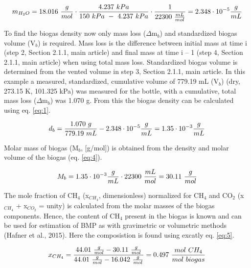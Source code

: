 \documentclass[]{article}
\begin{document}
\begin{equation*}
\centering
  m_{H_2O} = 18.016\ \frac{g}{mol} \cdot \frac{4.237\ kPa}{150\ kPa\ -\ 4.237\ kPa} \cdot \frac{1}{22300\ \frac{mL}{mol}} = 2.348 \cdot 10^{-5} \frac{g}{mL}
\end{equation*}

To find the biogas density now only mass loss ($\Delta$m$_b$) and standardized biogas volume (V$_b$) is required. Mass loss is the difference between initial mass at time i (step 2, Section 2.1.1, main article) and final mass at time i – 1 (step 4, Section 2.1.1, main article) when using total mass loss. Standardized biogas volume is determined from the vented volume in step 3, Section 2.1.1, main article.
In this example a measured, standardized, cumulative volume of 779.19 mL (V$_b$) (dry, 273.15 \degree K, 101.325 kPa) was measured for the bottle, with a cumulative, total mass loss ($\Delta$m$_b$) was 1.070 g. From this the biogas density can be calculated using eq. \ref{eq:1}.

\begin{equation*}
  \centering
  d_b=\frac{1.070\ g}{779.19\ mL} - 2.348 \cdot 10^{-5} \frac{g}{mL} = 1.35 \cdot 10^{-3} \frac{g}{mL}
\end{equation*}

\noindent Molar mass of biogas (M$_b$, [g/mol]) is obtained from the density and molar volume of the biogas (eq. \ref{eq:4}).

\begin{equation*}
  \centering
  M_b= 1.35 \cdot 10^{-3} \frac{g}{mL} \cdot 22300\ \frac{mL}{mol} = 30.11\ \frac{g}{mol}
\end{equation*}

\noindent The mole fraction of CH$_4$ (x$_{CH_4}$, dimensionless) normalized for CH$_4$ and CO$_2$ (x$_{CH_4}$ + x$_{CO_2}$ = unity) is calculated from the molar masses of the biogas components. Hence, the content of CH$_4$ present in the biogas is known and can be used for estimation of BMP as with gravimetric or volumetric methods (Hafner et al., 2015). Here the composistion is found using excatly eq. \ref{eq:5}.

\begin{equation*}
  \centering
  x_{CH_4}=\frac{44.01\ \frac{g}{mol}-30.11\ \frac{g}{mol}}{44.01\ \frac{g}{mol}-16.042\ \frac{g}{mol}} = 0.497\ \frac{mol\ CH_4}{mol\ biogas}
\end{equation*}
\end{document}
